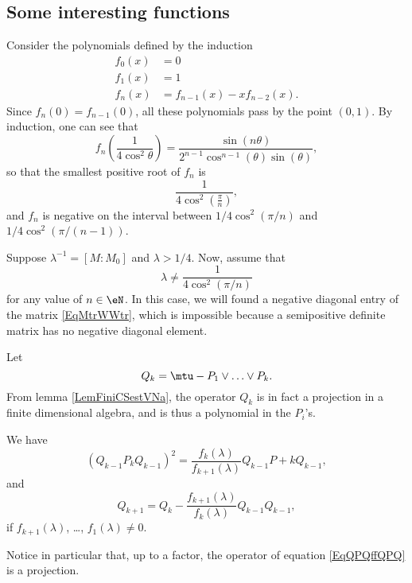 					\subsection{Some interesting functions}

Consider the polynomials defined by the induction
\begin{subequations}
\begin{align}
	f_0(x)&=0	\\
	f_1(x)&=1	\\
	f_n(x)&=f_{n-1}(x)-xf_{n-2}(x).	
\end{align}
\end{subequations}
Since $f_n(0)=f_{n-1}(0)$, all these polynomials pass by the point $(0,1)$. By induction, one can see that
\begin{equation}
	f_n\left( \frac{1}{ 4\cos^2\theta } \right)=\frac{\sin(n\theta)}{2^{n-1}\cos^{n-1}(\theta)\sin(\theta)},
\end{equation}
so that	the smallest positive root of $f_n$ is 
\begin{equation}
	\frac{1}{ 4\cos^2\left( \frac{ \pi }{ n } \right) },
\end{equation}
and $f_n$ is negative on the interval between $1/4\cos^2(\pi/n)$ and $1/4\cos^2(\pi/(n-1))$.

Suppose $\lambda^{-1}=[M:M_0]$ and $\lambda>1/4$. Now, assume that 
\begin{equation}
	\lambda\neq \frac{1}{ 4\cos^{2}(\pi/n) }
\end{equation}
for any value of $n\in\eN$. In this case, we will found a negative diagonal entry of the matrix \eqref{EqMtrWWtr}, which is impossible because a semipositive definite matrix has no negative diagonal element.

Let 
\begin{equation}
	Q_k=\mtu-P_1\vee\ldots\vee P_k.
\end{equation}
From lemma \ref{LemFiniCSestVNa}, the operator $Q_k$ is in fact a projection in a finite dimensional algebra, and is thus a polynomial in the $P_i$'s.

\begin{lemma}
	We have
\begin{equation}		\label{EqQPQffQPQ}
	(Q_{k-1}P_kQ_{k-1})^2=\frac{ f_k(\lambda) }{ f_{k+1}(\lambda) }Q_{k-1}P+kQ_{k-1},
\end{equation}
and 
\begin{equation}
	Q_{k+1}=Q_k-\frac{ f_{k+1}(\lambda) }{ f_k(\lambda) }Q_{k-1}Q_{k-1},
\end{equation}
if $f_{k+1}(\lambda)$, \ldots, $f_1(\lambda)\neq0$.
\end{lemma}
Notice in particular that, up to a factor, the operator of equation \eqref{EqQPQffQPQ} is a projection.

